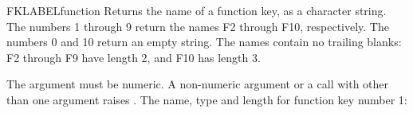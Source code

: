 \begin{XbaseEntry}{FKLABEL}{function}
Returns the name of a function key, as a character string.
\Syntax
{}
\Usage
The numbers 1 through 9 return the names F2 through F10, respectively.
The numbers 0 and 10 return an empty string. The names contain no trailing
blanks: F2 through F9 have length 2, and F10 has length 3.

The argument must be numeric. A non-numeric argument or a call with other
than one argument raises .
\Examples
The name, type and length for function key number 1:
\end{XbaseEntry}

